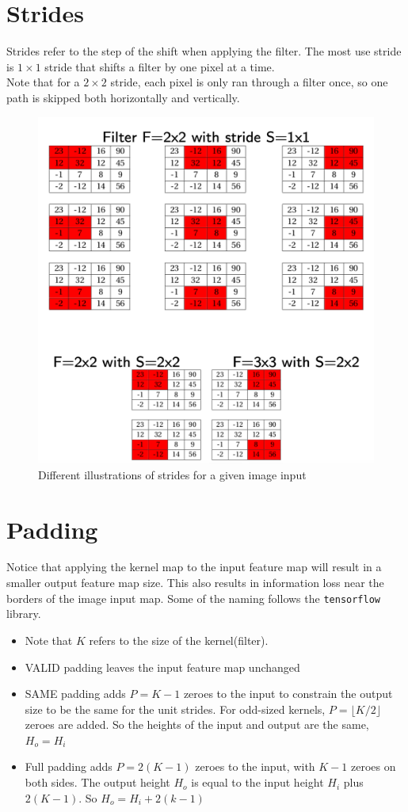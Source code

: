 \section{Strides}
Strides refer to the step of the shift when applying the filter. The most use stride is \(1 \times 1\) stride that shifts a filter by one pixel at a time.\\

Note that for a \( 2 \times 2\) stride, each pixel is only ran through a filter once, so one path is skipped both horizontally and vertically. 

\begin{figure}[H]
    \centering
    \includegraphics[width=0.75\linewidth]{img/strides.png}
    \caption{Different illustrations of strides for a given image input}
    
\end{figure}

\section{Padding}
Notice that applying the kernel map to the input feature map will result in a smaller output feature map size. This also results in information loss near the borders of the image input map. Some of the naming follows  the \texttt{tensorflow} library.

\begin{itemize}
    \item Note that $K$ refers to the size of the kernel(filter).
    \item VALID padding leaves the input feature map unchanged
    \item SAME padding adds $P=K-1$ zeroes to the input to constrain the output size to be the same for the unit strides. For odd-sized kernels, $P=\lfloor K/2\rfloor $ zeroes are added. So the heights of the input and output are the same, $H_o = H_i$
    \item Full padding adds $P=2(K-1)$ zeroes to the input, with $K-1$ zeroes on both sides. The output height $H_o$ is equal to the input height $H_i$ plus $2(K-1)$. So $H_o = H_i + 2(k-1)$

    
\end{itemize}


